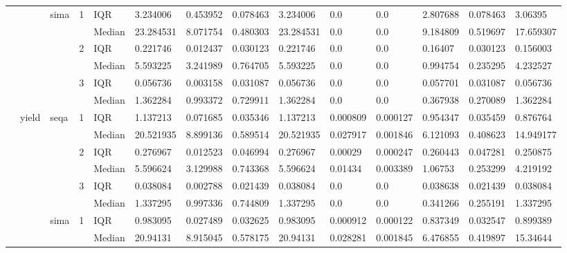 \begin{tabular}{llllllllllllll}
    &       & sima & 1 & IQR &   3.234006 &   0.453952 &  0.078463 &   3.234006 &       0.0 &       0.0 &   2.807688 &  0.078463 &    3.06395 \\
    &       &      &   & Median &  23.284531 &   8.071754 &  0.480303 &  23.284531 &       0.0 &       0.0 &   9.184809 &  0.519697 &  17.659307 \\
    &       &      & 2 & IQR &   0.221746 &   0.012437 &  0.030123 &   0.221746 &       0.0 &       0.0 &    0.16407 &  0.030123 &   0.156003 \\
    &       &      &   & Median &   5.593225 &   3.241989 &  0.764705 &   5.593225 &       0.0 &       0.0 &   0.994754 &  0.235295 &   4.232527 \\
    &       &      & 3 & IQR &   0.056736 &   0.003158 &  0.031087 &   0.056736 &       0.0 &       0.0 &   0.057701 &  0.031087 &   0.056736 \\
    &       &      &   & Median &   1.362284 &   0.993372 &  0.729911 &   1.362284 &       0.0 &       0.0 &   0.367938 &  0.270089 &   1.362284 \\
    & yield & seqa & 1 & IQR &   1.137213 &   0.071685 &  0.035346 &   1.137213 &  0.000809 &  0.000127 &   0.954347 &  0.035459 &   0.876764 \\
    &       &      &   & Median &  20.521935 &   8.899136 &  0.589514 &  20.521935 &  0.027917 &  0.001846 &   6.121093 &  0.408623 &  14.949177 \\
    &       &      & 2 & IQR &   0.276967 &   0.012523 &  0.046994 &   0.276967 &   0.00029 &  0.000247 &   0.260443 &  0.047281 &   0.250875 \\
    &       &      &   & Median &   5.596624 &   3.129988 &  0.743368 &   5.596624 &   0.01434 &  0.003389 &    1.06753 &  0.253299 &   4.219192 \\
    &       &      & 3 & IQR &   0.038084 &   0.002788 &  0.021439 &   0.038084 &       0.0 &       0.0 &   0.038638 &  0.021439 &   0.038084 \\
    &       &      &   & Median &   1.337295 &   0.997336 &  0.744809 &   1.337295 &       0.0 &       0.0 &   0.341266 &  0.255191 &   1.337295 \\
    &       & sima & 1 & IQR &   0.983095 &   0.027489 &  0.032625 &   0.983095 &  0.000912 &  0.000122 &   0.837349 &  0.032547 &   0.899389 \\
    &       &      &   & Median &   20.94131 &   8.915045 &  0.578175 &   20.94131 &  0.028281 &  0.001845 &   6.476855 &  0.419897 &   15.34644 \\

\end{tabular}
